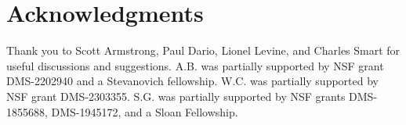 \documentclass{daj}
\begin{document}
\section*{Acknowledgments}
Thank you to Scott Armstrong, Paul Dario, Lionel Levine, and Charles Smart for useful discussions and suggestions.
A.B. was partially supported by NSF grant DMS-2202940 and a Stevanovich fellowship.
W.C. was partially supported by NSF grant DMS-2303355.
S.G. was partially supported by NSF grants DMS-1855688,
DMS-1945172, and a Sloan Fellowship.


{
	
	
}
\end{document}
